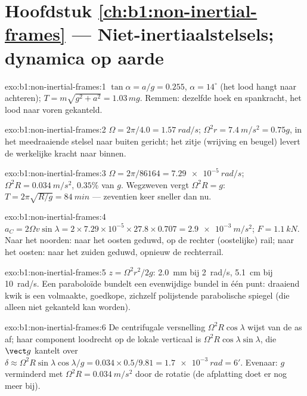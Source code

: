 \section*{Hoofdstuk \ref{ch:b1:non-inertial-frames} --- Niet-inertiaalstelsels; dynamica op aarde}

\begin{solution}{exo:b1:non-inertial-frames:1}
$\tan\alpha = a/g = 0.255$, $\alpha = 14^\circ$ (het lood hangt naar achteren);
$T = m\sqrt{g^2 + a^2} = 1.03\,mg$. Remmen: dezelfde hoek en spankracht, het lood
naar voren gekanteld.
\end{solution}

\begin{solution}{exo:b1:non-inertial-frames:2}
$\Omega = 2\pi/4.0 = \qty{1.57}{rad/s}$; $\Omega^2r = \qty{7.4}{m/s^2} = 0.75g$,
in het meedraaiende stelsel naar buiten gericht; het zitje (wrijving en
beugel) levert de werkelijke kracht naar binnen.
\end{solution}

\begin{solution}{exo:b1:non-inertial-frames:3}
$\Omega = 2\pi/86164 = \qty{7.29e-5}{rad/s}$; $\Omega^2R = \qty{0.034}{m/s^2}$,
$0.35\%$ van $g$. Wegzweven vergt $\Omega^2R = g$: $T = 2\pi\sqrt{R/g} =
\qty{84}{min}$ --- zeventien keer sneller dan nu.
\end{solution}

\begin{solution}{exo:b1:non-inertial-frames:4}
$a_C = 2\Omega v\sin\lambda = 2 \times 7.29\times10^{-5} \times 27.8 \times 0.707
= \qty{2.9e-3}{m/s^2}$; $F = \qty{1.1}{kN}$. Naar het noorden: naar het oosten geduwd,
op de rechter (oostelijke) rail; naar het oosten: naar het zuiden geduwd, opnieuw
de rechterrail.
\end{solution}

\begin{solution}{exo:b1:non-inertial-frames:5}
$z = \Omega^2r^2/2g$: \qty{2.0}{mm} bij \qty{2}{rad/s}, \qty{5.1}{cm} bij
\qty{10}{rad/s}. Een paraboloïde bundelt een evenwijdige bundel in één punt:
draaiend kwik is een volmaakte, goedkope, zichzelf polijstende parabolische spiegel
(die alleen niet gekanteld kan worden).
\end{solution}

\begin{solution}{exo:b1:non-inertial-frames:6}
De centrifugale versnelling $\Omega^2R\cos\lambda$ wijst van de
as af; haar component loodrecht op de lokale verticaal is $\Omega^2R\cos\lambda
\sin\lambda$, die $\vect g$ kantelt over $\delta \approx \Omega^2R\sin\lambda\cos\lambda/g
= 0.034 \times 0.5/9.81 = \qty{1.7e-3}{rad} = 6'$. Evenaar: $g$ verminderd met
$\Omega^2R = \qty{0.034}{m/s^2}$ door de rotatie (de afplatting doet er nog meer bij).
\end{solution}

